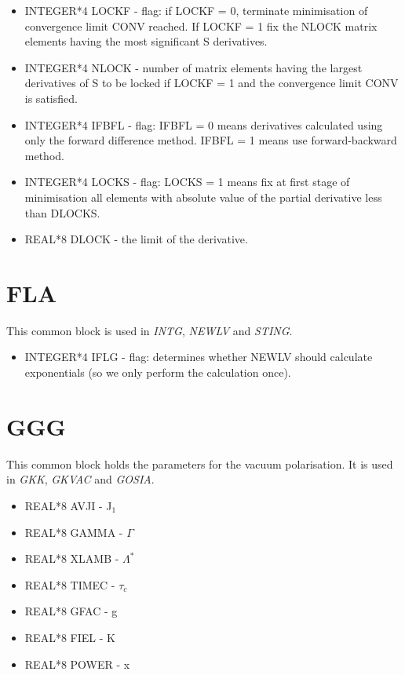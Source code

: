 \begin{itemize}
\item INTEGER*4 LOCKF - flag: if LOCKF = 0, terminate minimisation of convergence limit
CONV reached. If LOCKF = 1 fix the NLOCK matrix elements having the most
significant S derivatives.
\item INTEGER*4 NLOCK - number of matrix elements having the largest
derivatives of S to be locked if LOCKF = 1 and the convergence limit CONV is
satisfied.
\item INTEGER*4 IFBFL - flag: IFBFL = 0 means derivatives calculated using
only the forward difference method. IFBFL = 1 means use forward-backward
method.
\item INTEGER*4 LOCKS - flag: LOCKS = 1 means fix at first stage of
minimisation all elements with absolute value of the partial derivative less
than DLOCKS.
\item REAL*8 DLOCK - the limit of the derivative.
\end{itemize}

\section{FLA}

This common block is used in \emph{INTG}, \emph{NEWLV} and \emph{STING}.

\begin{itemize}
\item INTEGER*4 IFLG - flag: determines whether {NEWLV} should calculate
exponentials (so we only perform the calculation once).
\end{itemize}

\section{GGG}

This common block holds the parameters for the vacuum polarisation. It is
used in \emph{GKK}, \emph{GKVAC} and \emph{GOSIA}.

\begin{itemize}
\item REAL*8 AVJI - J$_1$
\item REAL*8 GAMMA - $\Gamma$
\item REAL*8 XLAMB - $\Lambda^*$
\item REAL*8 TIMEC - $\tau_c$
\item REAL*8 GFAC - g
\item REAL*8 FIEL - K
\item REAL*8 POWER - x
\end{itemize}

